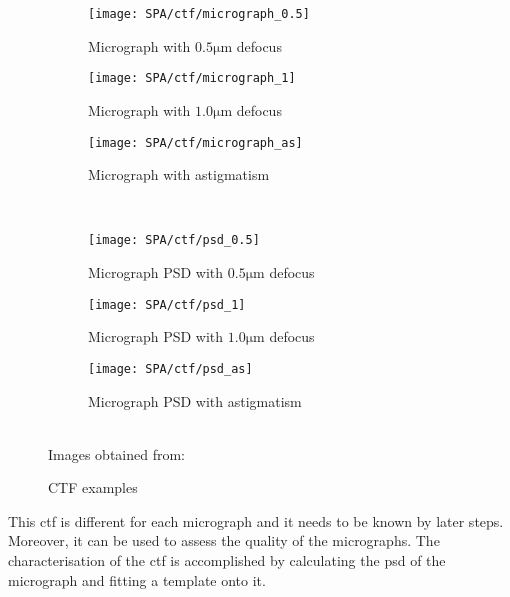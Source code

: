\documentclass[../main.tex]{subfiles}
\begin{document}
\begin{figure}[htbp]
    \centering
    \begin{subfigure}[b]{0.3\textwidth}
        \centering
        \texttt{[image: SPA/ctf/micrograph\_0.5]}
        \caption{Micrograph with $0.5\si{\micro\metre}$ defocus}
        \label{fig:2:ctf:mic0.5}
    \end{subfigure}
    \hfill
    \begin{subfigure}[b]{0.3\textwidth}
        \centering
        \texttt{[image: SPA/ctf/micrograph\_1]}
        \caption{Micrograph with $1.0\si{\micro\metre}$ defocus}
        \label{fig:2:ctf:mic1.0}
    \end{subfigure}
    \hfill
    \begin{subfigure}[b]{0.3\textwidth}
        \centering
        \texttt{[image: SPA/ctf/micrograph\_as]}
        \caption{Micrograph with astigmatism}
        \label{fig:2:ctf:mic_as}
    \end{subfigure}\\
    \vspace{1em}
    \begin{subfigure}[b]{0.3\textwidth}
        \centering
        \texttt{[image: SPA/ctf/psd\_0.5]}
        \caption{Micrograph PSD with $0.5\si{\micro\metre}$ defocus}
        \label{fig:2:ctf:psd0.5}
    \end{subfigure}
    \hfill
    \begin{subfigure}[b]{0.3\textwidth}
        \centering
        \texttt{[image: SPA/ctf/psd\_1]}
        \caption{Micrograph PSD with $1.0\si{\micro\metre}$ defocus}
        \label{fig:2:ctf:psd1.0}
    \end{subfigure}
    \hfill
    \begin{subfigure}[b]{0.3\textwidth}
        \centering
        \texttt{[image: SPA/ctf/psd\_as]}
        \caption{Micrograph PSD with astigmatism}
        \label{fig:2:ctf:psd_as}
    \end{subfigure}\\
    Images obtained from: \cite{cryoem101}
    \caption{CTF examples}
    \label{fig:2:ctf}
\end{figure}

This \gls{ctf} is different for each micrograph and it needs to be known by later steps. Moreover, it can be used to assess the quality of the micrographs\cite{cryoem101}. The characterisation of the \gls{ctf} is accomplished by calculating the \gls{psd} of the micrograph and fitting a template onto it.
\end{document}
